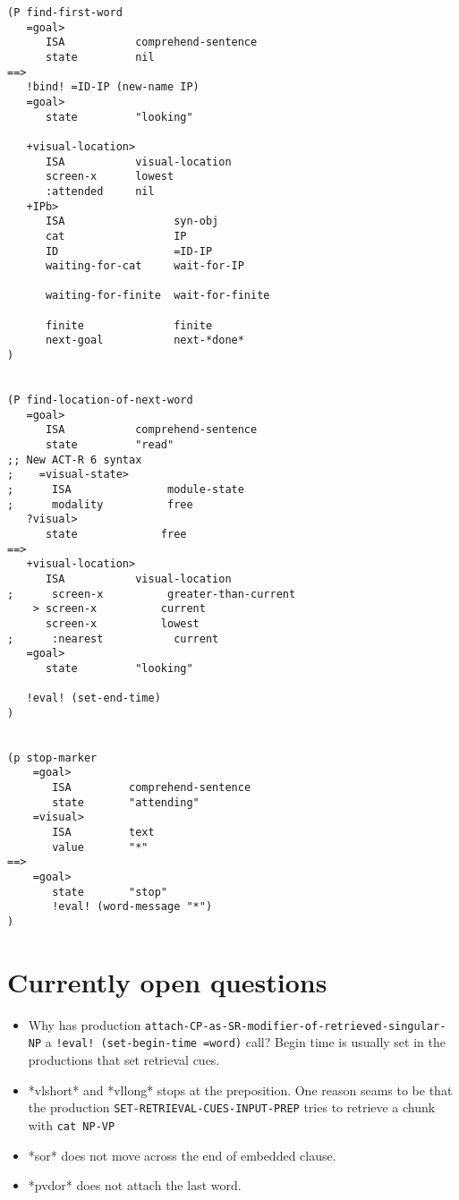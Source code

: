 \documentclass[nobf,fignum,doc,longtable]{apa}
\begin{document}
{\scriptsize \begin{verbatim}
(P find-first-word
   =goal>
      ISA         	comprehend-sentence
      state       	nil
==>
   !bind! =ID-IP (new-name IP)
   =goal>
      state       	"looking"
      
   +visual-location>
      ISA         	visual-location
      screen-x    	lowest
      :attended    	nil
   +IPb>
      ISA                 syn-obj
      cat                 IP
      ID                  =ID-IP
      waiting-for-cat     wait-for-IP

      waiting-for-finite  wait-for-finite

      finite              finite
      next-goal           next-*done*
)


(P find-location-of-next-word
   =goal>
      ISA         	comprehend-sentence
      state       	"read"
;; New ACT-R 6 syntax
;    =visual-state>
;      ISA               module-state
;      modality          free
   ?visual>
      state             free
==>
   +visual-location>
      ISA         	visual-location
;      screen-x          greater-than-current
    > screen-x          current
      screen-x          lowest
;      :nearest           current
   =goal>
      state       	"looking"

   !eval! (set-end-time)
)


(p stop-marker
    =goal>
       ISA         comprehend-sentence
       state	   "attending"
    =visual>
       ISA         text
       value       "*"
==>
    =goal>
       state       "stop"
       !eval! (word-message "*")
)
\end{verbatim}}


\section{Currently open questions}
\begin{itemize}
\item Why has production \texttt{attach-CP-as-SR-modifier-of-retrieved-singular-NP} a \texttt{!eval! (set-begin-time =word)} call? Begin time is usually set in the productions that set retrieval cues.
\item *vlshort* and *vllong* stops at the preposition. One reason seams to be that the production \texttt{SET-RETRIEVAL-CUES-INPUT-PREP} tries to retrieve a chunk with \texttt{cat	NP-VP}
\item *sor* does not move across the end of embedded clause.
\item *pvdor* does not attach the last word.
\end{itemize}



%
\end{document}
